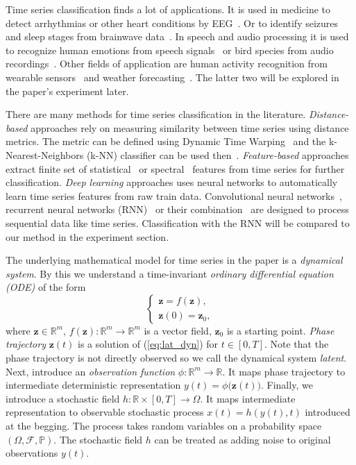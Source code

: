 \documentclass[referee, pdflatex, sn-mathphys-num]{sn-jnl}
\theoremstyle{definition}
\theoremstyle{plain}
\newcommand{\bz}{\ensuremath{\mathbf{z}}}
\begin{document}
		Time series classification finds a lot of applications. It is used in medicine to detect arrhythmias or other heart conditions by EEG~\cite{application_eeg_1}. Or to identify seizures and sleep stages from brainwave data~\cite{application_eeg_2}. In speech and audio processing it is used to recognize human emotions from speech signals~\cite{application_sound_1} or bird species from audio recordings~\cite{application_sound_2}. Other fields of application are human activity recognition from wearable sensors~\cite{application_hac} and weather forecasting~\cite{application_weather}. The latter two will be explored in the paper's experiment later.
		
		There are many methods for time series classification in the literature. \emph{Distance-based} approaches rely on measuring similarity between time series using distance metrics. The metric can be defined using Dynamic Time Warping~\cite{dtw} and the k-Nearest-Neighbors (k-NN) classifier can be used then~\cite{knn_dtw}. \emph{Feature-based} approaches extract finite set of statistical~\cite{stat_feat_1, stat_feat_2} or spectral~\cite{fouirer_feat} features from time series for further classification. \emph{Deep learning} approaches uses neural networks to automatically learn time series features from raw train data. Convolutional neural networks~\cite{application_eeg_1, application_eeg_2}, recurrent neural networks (RNN)~\cite{lstm_feat} or their combination~\cite{application_sound_1, application_hac, application_weather} are designed to process sequential data like time series. Classification with the RNN will be compared to our method in the experiment section.
		
		The underlying mathematical model for time series in the paper is a \emph{dynamical system}. By this we understand a time-invariant \emph{ordinary differential equation (ODE)} of the form
		\begin{equation}\label{eq:lat_dyn}
			\begin{cases}
				\bz = f(\bz), \\
				\bz(0) = \bz_0,
			\end{cases}
		\end{equation}
		where $\bz \in \mathbb{R}^m$, $f(\bz): \mathbb{R}^m \to \mathbb{R}^m$ is a vector field, $\bz_0$ is a starting point. \textit{Phase trajectory} $\bz(t)$ is a solution of (\ref{eq:lat_dyn}) for $t \in [0, T]$. Note that the phase trajectory is not directly observed so we call the dynamical system \emph{latent}. Next, introduce an \emph{observation function} $\phi: \mathbb{R}^m \to \mathbb{R}$. It maps phase trajectory to intermediate deterministic representation $y(t) = \phi \big( \bz(t) \big)$. Finally, we introduce a stochastic field $h:  \mathbb{R} \times [0, T] \to \Omega$. It maps intermediate representation to observable stochastic process $x(t) = h(y(t), t)$ introduced at the begging. The process takes random variables on a probability space $(\Omega, \mathcal{F}, \mathbb{P})$. The stochastic field $h$ can be treated as adding noise to original observations $y(t)$.
		
\end{document}
